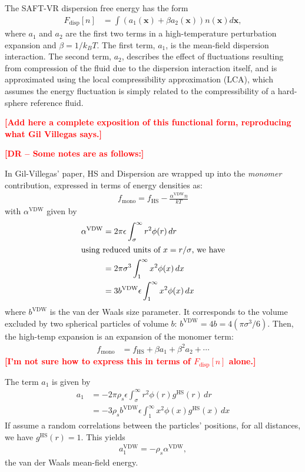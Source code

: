 \documentclass[letterpaper,twocolumn,amsmath,amssymb,pre,aps,10pt]{revtex4-1}
\newcommand\xx{\mathbf{x}}
\newcommand\fixme[1]{\textcolor{red}{\textbf{[#1]}}}
\begin{document}
The SAFT-VR dispersion free energy has the form~\cite{gil-villegas-1997-SAFT-VR}
\begin{align}
  F_\text{disp}[n] &= \int \left(a_1(\xx) + \beta a_2(\xx)\right)n(\xx)d\xx,
\end{align}
where $a_1$ and $a_2$ are the first two terms in a high-temperature
perturbation expansion and $\beta=1/k_BT$.  The first term, $a_1$, is
the mean-field dispersion interaction. The second term, $a_2$, describes the
effect of fluctuations resulting from compression of the fluid due
to the dispersion interaction itself, and is approximated
using the local compressibility approximation (LCA), which
assumes the energy fluctuation is simply related to the
compressibility of a hard-sphere reference fluid\cite{barker1976liquid}.

\fixme{Add here a complete exposition of this functional form,
  reproducing what Gil Villegas says.}

\fixme{DR -- Some notes are as follows:}

In Gil-Villegas' paper, HS and Dispersion are wrapped up into the
\textit{monomer} contribution, expressed in terms of energy densities
as:
\begin{align}
  f_\text{mono} = f_\text{HS} - \frac{\alpha^\text{VDW}n}{kT}
\end{align}
with $\alpha^\text{VDW}$ given by
\begin{align}
  \alpha^\text{VDW} &= 2\pi\epsilon\int_\sigma^\infty r^2\phi(r)\,dr \\
  \intertext{using reduced units of $x = r/\sigma$, we have}
  &= 2\pi\sigma^3\int_1^\infty x^2\phi(x)\,dx \\
  &= 3b^\text{VDW}\epsilon\int_1^\infty x^2\phi(x)\,dx
\end{align}
where $b^\text{VDW}$ is the van der Waals size parameter. It corresponds to the volume excluded by two spherical particles of volume $b$: $b^\text{VDW} = 4b = 4\left(\pi\sigma^3/6\right)$.
Then, the high-temp expansion is an expansion of the monomer term:
\begin{align}
  f_\text{mono} &= f_\text{HS} + \beta a_1 + \beta^2 a_2 + \cdots
\end{align}
\fixme{I'm not sure how to express this in terms of $F_\text{disp}[n]$ alone.}

The term $a_1$ is given by
\begin{align}
  a_1 &= -2\pi\rho_s\epsilon\int_\sigma^\infty r^2\phi(r)g^\text{HS}(r)\,dr \\
  &= -3\rho_sb^\text{VDW}\epsilon\int_1^\infty x^2\phi(x)g^\text{HS}(x)\,dx
\end{align}
If assume a random correlations between the particles' positions, for all distances, we have $g^\text{HS}(r) = 1$. This yields
\begin{align}
  a_1^\text{VDW} = -\rho_s\alpha^\text{VDW},
\end{align}
the van der Waals mean-field energy.
\end{document}

